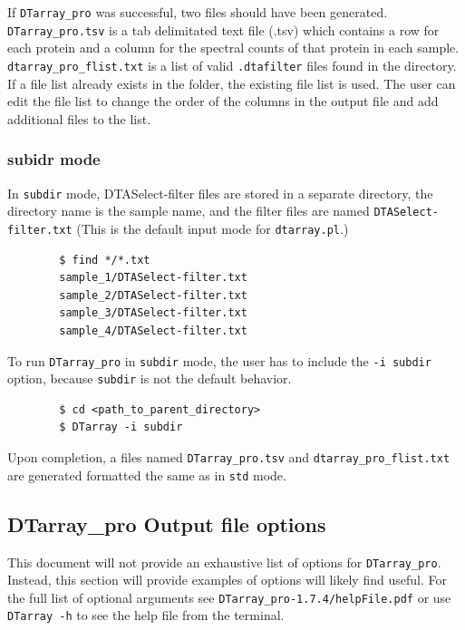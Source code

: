 \documentclass[12pt]{article}
\newcommand{\VERSION}{1.7.4}
\begin{document}
	\noindent
	If \texttt{DTarray\_pro} was successful, two files should have been generated.  \texttt{DTarray\_pro.tsv} is a tab delimitated text file (.tsv) which contains a row for each protein and a column for the spectral counts of that protein in each sample.  \texttt{dtarray\_pro\_flist.txt} is a list of valid \texttt{.dtafilter} files found in the directory.  If a file list already exists in the folder, the existing file list is used.  The user can edit the file list to change the order of the columns in the output file and add additional files to the list.  
	
	\subsubsection{subidr mode}
	
	In \texttt{subdir} mode, DTASelect-filter files are stored in a separate directory, the directory name is the sample name, and the filter files are named \texttt{DTASelect-filter.txt} (This is the default input mode for \texttt{dtarray.pl}.)
	
	\begin{lstlisting}
		$ find */*.txt
		sample_1/DTASelect-filter.txt
		sample_2/DTASelect-filter.txt
		sample_3/DTASelect-filter.txt
		sample_4/DTASelect-filter.txt
	\end{lstlisting}
	
	\noindent
	To run \texttt{DTarray\_pro} in \texttt{subdir} mode, the user has to include the \texttt{-i subdir} option, because \texttt{subdir} is not the default behavior.  
	
	\begin{lstlisting}
		$ cd <path_to_parent_directory>
		$ DTarray -i subdir
	\end{lstlisting}
	
	\noindent
	Upon completion, a files named \texttt{DTarray\_pro.tsv} and \texttt{dtarray\_pro\_flist.txt} are generated formatted the same as in \texttt{std} mode.
	
	\subsection{DTarray\_pro Output file options}
	
	This document will not provide an exhaustive list of options for \texttt{DTarray\_pro}. Instead, this section will provide examples of options will likely find useful.  For the full list of optional arguments see \texttt{DTarray\_pro-\VERSION/helpFile.pdf} or use \texttt{DTarray -h} to see the help file from the terminal.
	
\end{document}
